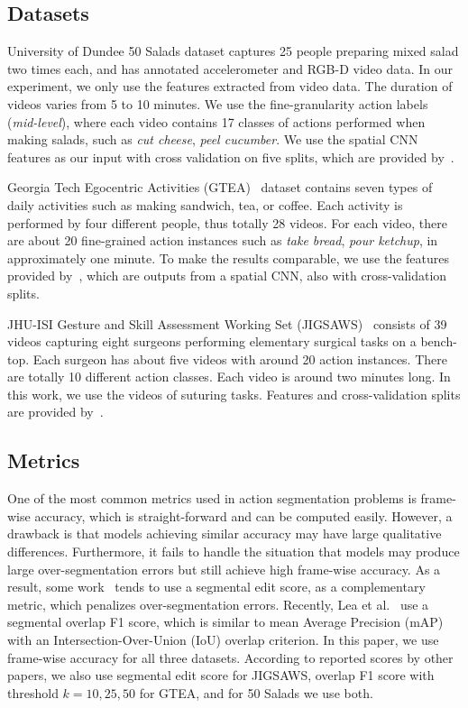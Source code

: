 \documentclass{article}
\begin{document}
\subsection{Datasets}

University of Dundee 50 Salads \cite{50salads} dataset captures 25 people preparing mixed salad two times each, and has annotated accelerometer and RGB-D video data. In our experiment, we only use the features extracted from video data. The duration of videos varies from 5 to 10 minutes. We use the fine-granularity action labels (\textit{mid-level}), where each video contains 17 classes of actions performed when making salads, such as \textit{cut cheese}, \textit{peel cucumber}. We use the spatial CNN~\cite{scnn} features as our input with cross validation on five splits, which are provided by~\cite{LeFlViCVPR2017}.

Georgia Tech Egocentric Activities (GTEA)~\cite{gtea} dataset contains seven types of daily activities such as making sandwich, tea, or coffee. Each activity is performed by four different people, thus totally 28 videos. For each video, there are about 20 fine-grained action instances such as \textit{take bread}, \textit{pour ketchup}, in approximately one minute. To make the results comparable, we use the features provided by~\cite{LeFlViCVPR2017}, which are outputs from a spatial CNN, also with cross-validation splits.

JHU-ISI Gesture and Skill Assessment Working Set (JIGSAWS)~\cite{jigsaws} consists of 39 videos capturing eight surgeons performing elementary surgical tasks on a bench-top. Each surgeon has about five videos with around 20 action instances. There are totally 10 different action classes. Each video is around two minutes long. In this work, we use the videos of suturing tasks. Features and cross-validation splits are provided by~\cite{tcnw}.


\subsection{Metrics}

One of the most common metrics used in action segmentation problems is frame-wise accuracy, which is straight-forward and can be computed easily. However, a drawback  is that models achieving similar accuracy may have large qualitative differences. Furthermore, it fails to handle the situation that models may produce large over-segmentation errors but still achieve high frame-wise accuracy. As a result, some work~\cite{scnn,lea} tends to use a segmental edit score, as a complementary metric, which penalizes over-segmentation errors. Recently, Lea et al.~\cite{LeFlViCVPR2017} use a segmental overlap F1 score, which is similar to mean Average Precision (mAP) with an Intersection-Over-Union (IoU) overlap criterion. In this paper, we use frame-wise accuracy for all three datasets. According to reported scores by other papers, we also use segmental edit score for JIGSAWS, overlap F1 score with threshold $k=10, 25, 50$ for GTEA, and for 50 Salads we use both. 
\end{document}

